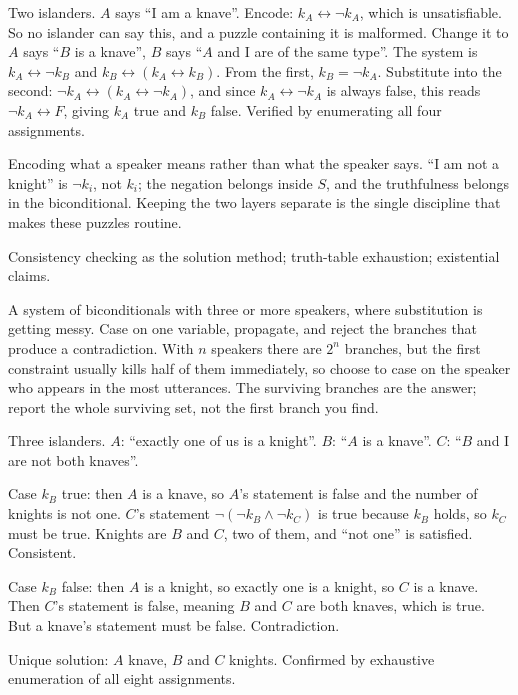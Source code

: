 \begin{worked}
Two islanders. $A$ says ``I am a knave''. Encode: $k_{A}\leftrightarrow \lnot k_{A}$, which is unsatisfiable. So no islander can say this, and a puzzle containing it is malformed. Change it to $A$ says ``$B$ is a knave'', $B$ says ``$A$ and I are of the same type''. The system is $k_{A}\leftrightarrow\lnot k_{B}$ and $k_{B}\leftrightarrow(k_{A}\leftrightarrow k_{B})$. From the first, $k_{B}=\lnot k_{A}$. Substitute into the second: $\lnot k_{A}\leftrightarrow(k_{A}\leftrightarrow\lnot k_{A})$, and since $k_{A}\leftrightarrow\lnot k_{A}$ is always false, this reads $\lnot k_{A}\leftrightarrow F$, giving $k_{A}$ true and $k_{B}$ false. Verified by enumerating all four assignments.
\end{worked}

\begin{trap}
Encoding what a speaker means rather than what the speaker says. ``I am not a knight'' is $\lnot k_{i}$, not $k_{i}$; the negation belongs inside $S$, and the truthfulness belongs in the biconditional. Keeping the two layers separate is the single discipline that makes these puzzles routine.
\end{trap}

\begin{seealsob}Consistency checking as the solution method; truth-table exhaustion; existential claims.\end{seealsob}

\cue A system of biconditionals with three or more speakers, where substitution is getting messy.
\method Case on one variable, propagate, and reject the branches that produce a contradiction. With $n$ speakers there are $2^{n}$ branches, but the first constraint usually kills half of them immediately, so choose to case on the speaker who appears in the most utterances. The surviving branches are the answer; report the whole surviving set, not the first branch you find.

\begin{worked}
Three islanders. $A$: ``exactly one of us is a knight''. $B$: ``$A$ is a knave''. $C$: ``$B$ and I are not both knaves''.

Case $k_{B}$ true: then $A$ is a knave, so $A$'s statement is false and the number of knights is not one. $C$'s statement $\lnot(\lnot k_{B}\wedge \lnot k_{C})$ is true because $k_{B}$ holds, so $k_{C}$ must be true. Knights are $B$ and $C$, two of them, and ``not one'' is satisfied. Consistent.

Case $k_{B}$ false: then $A$ is a knight, so exactly one is a knight, so $C$ is a knave. Then $C$'s statement is false, meaning $B$ and $C$ are both knaves, which is true. But a knave's statement must be false. Contradiction.

Unique solution: $A$ knave, $B$ and $C$ knights. Confirmed by exhaustive enumeration of all eight assignments.
\end{worked}

